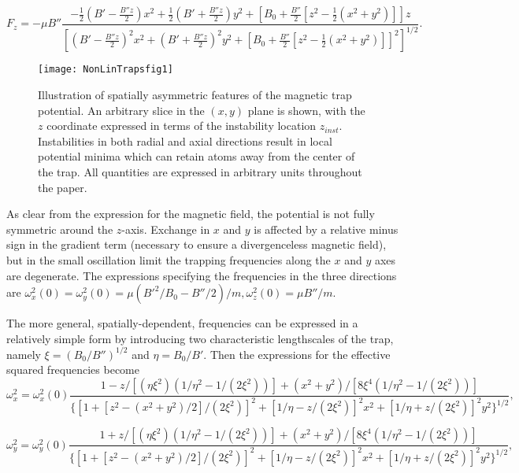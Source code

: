 \documentclass[pra,letterpaper,onecolumn,superscriptaddress,floatfix]{revtex4}
\begin{document}
\begin{equation}
F_z=-\mu B'' \frac{-\frac{1}{2}\left(B'-\frac{B''z}{2}\right)x^2+
\frac{1}{2}\left(B'+\frac{B''z}{2}\right)y^2
+\left[B_0+\frac{B''}{2}[z^2-\frac{1}{2}(x^2+y^2)]\right]z}
{\left[\left(B'-\frac{B''z}{2}\right)^2x^2+\left(B'+\frac{B''z}{2}\right)^2y^2+
\left[B_0+\frac{B''}{2}[z^2-\frac{1}{2}(x^2+y^2)]\right]^2\right]^{1/2}}.
\tag{3c}
\label{3c}
\end{equation} 

\begin{figure}[b]
\texttt{[image: NonLinTrapsfig1]}
\caption{Illustration of spatially asymmetric features of the magnetic trap potential. 
An arbitrary slice in the $(x,y)$ plane is shown, with the $z$ coordinate expressed in terms of
the instability location $z_{inst}$. Instabilities in both radial and axial directions result in
local potential minima which can retain atoms away from the center of the trap.
All quantities are expressed in arbitrary units throughout the paper.}
\label{Fig1}
\end{figure}

As clear from the expression for the magnetic field, the potential is not fully symmetric 
around the $z$-axis. Exchange in $x$ and $y$  is affected by a relative minus sign in the 
gradient term (necessary to ensure a divergenceless magnetic field), but in the small 
oscillation limit the trapping frequencies along the $x$ and $y$ axes are degenerate. 
The expressions specifying the frequencies in the three directions  are 
$\omega_x^2(0)=\omega_y^2(0)=\mu(B'^2/B_0-B''/2)/m, \omega_z^2(0)=\mu B''/m$.

The more general, spatially-dependent, frequencies can be expressed in a relatively simple form by 
introducing two characteristic lengthscales of the trap, namely $\xi=(B_0/B'')^{1/2}$ and $\eta=B_0/B'$.
Then the expressions for the effective squared frequencies become
\begin{equation}
\omega_x^2= \omega_x^2(0) \frac{1-z/[(\eta \xi^2)(1/\eta^2-1/(2\xi^2))]
+(x^2+y^2)/[8\xi^4(1/\eta^2-1/(2\xi^2))]}
{\{[1+[z^2-(x^2+y^2)/2]/(2\xi^2)]^2+[1/\eta-z/(2\xi^2)]^2x^2+[1/\eta+z/(2\xi^2)]^2y^2\}^{1/2}},
\tag{4a}
\label{4a}
\end{equation}

\begin{equation}
\omega_y^2= \omega_y^2(0) \frac{1+z/[(\eta \xi^2)(1/\eta^2-1/(2\xi^2))]
+(x^2+y^2)/[8\xi^4(1/\eta^2-1/(2\xi^2))]}
{\{[1+[z^2-(x^2+y^2)/2]/(2\xi^2)]^2+[1/\eta-z/(2\xi^2)]^2x^2+[1/\eta+z/(2\xi^2)]^2y^2\}^{1/2}},
\tag{4b}
\label{4b}
\end{equation}
\end{document}
